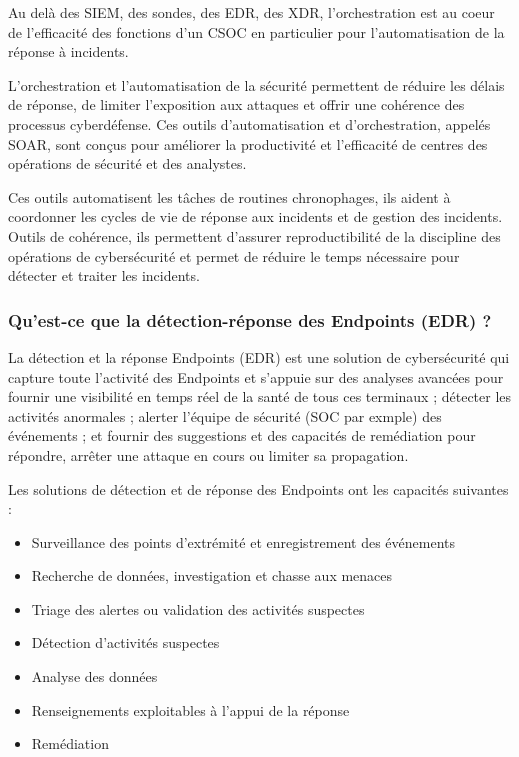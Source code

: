 Au delà des SIEM, des sondes, des EDR, des XDR, l'orchestration est au coeur de l'efficacité des fonctions d'un CSOC en particulier pour l'automatisation de la réponse à incidents.

L'orchestration et l'automatisation de la sécurité  permettent de réduire les délais de réponse, de  limiter l'exposition aux attaques et offrir une cohérence des processus cyberdéfense. Ces  outils d’automatisation et d’orchestration,  appelés SOAR, sont conçus pour améliorer la productivité et l’efficacité de centres des opérations de sécurité et des analystes.

Ces outils automatisent les tâches de routines chronophages,  ils aident à coordonner les cycles de vie de réponse aux incidents et de gestion des incidents. Outils de  cohérence, ils permettent d'assurer reproductibilité de la discipline des opérations de cybersécurité et permet de réduire le temps nécessaire pour détecter et traiter les incidents.

\subsubsection{Qu'est-ce que la détection-réponse des Endpoints (EDR) ?}

La détection et la réponse Endpoints (EDR) est une solution de cybersécurité qui capture toute l'activité des Endpoints et s'appuie sur des analyses avancées pour fournir une visibilité en temps réel de la santé de tous ces terminaux ; détecter les activités anormales ; alerter l'équipe de sécurité (SOC par exmple) des événements ; et fournir des suggestions et des capacités de remédiation pour répondre, arrêter une attaque en cours ou limiter sa propagation.

Les solutions de détection et de réponse des Endpoints ont les capacités suivantes :

\begin{itemize}
  \item Surveillance des points d'extrémité et enregistrement des événements
  \item Recherche de données, investigation et chasse aux menaces
  \item Triage des alertes ou validation des activités suspectes
  \item Détection d'activités suspectes
  \item Analyse des données
  \item Renseignements exploitables à l'appui de la réponse
  \item Remédiation
\end{itemize}


